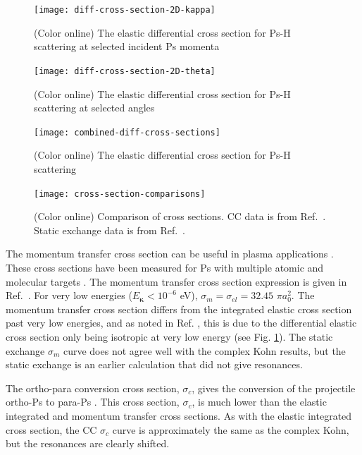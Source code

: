 \documentclass[preprint,showpacs,showkeys,preprintnumbers,amsmath,amssymb,longbibliography,pra,aps]{revtex4-1}
\begin{document}
\begin{figure}[H]
	\centering
	\texttt{[image: diff-cross-section-2D-kappa]}
	\caption{(Color online) The elastic differential cross section for Ps-H
scattering at selected incident Ps momenta}
	\label{fig:diff-cross-section-2D-kappa}
\end{figure}

\begin{figure}[H]
	\centering
	\texttt{[image: diff-cross-section-2D-theta]}
	\caption{(Color online) The elastic differential cross section for Ps-H
scattering at selected angles}
	\label{fig:diff-cross-section-2D-theta}
\end{figure}

\begin{figure}[H]
	\centering
	\texttt{[image: combined-diff-cross-sections]}
	\caption{(Color online) The elastic differential cross section for Ps-H
scattering}
	\label{fig:combined-diff-cross-sections}
\end{figure}

\begin{figure}[H]
	\centering
	\texttt{[image: cross-section-comparisons]}
	\caption{(Color online) Comparison of cross sections. CC data is from
Ref.~\cite{Blackwood2002}. Static exchange data is from Ref.~\cite{Hara1975}.}
	\label{fig:cross-section-comparisons}
\end{figure}

The momentum transfer cross section can be useful in plasma applications
\cite{Wang2014, McEachran2014}. These cross sections have been measured for Ps
with multiple atomic and molecular targets \cite{Nagashima1998,Saito2003}. The
momentum transfer cross section expression is given in Ref.~\cite{Bransden2003}.
For very low 
energies ($E_{\bm \kappa} < 10^{-6}$ eV),
$\sigma_m = \sigma_{el} = 32.45$ $\pi a_0^2$.
The momentum transfer cross section differs from the integrated elastic cross
section past very low energies, and as 
noted in Ref. \cite{Blackwood2002c}, this is due to the differential elastic 
cross section only being isotropic at very low energy
(see Fig. \ref{fig:diff-cross-section-2D-kappa}). The static
exchange $\sigma_m$ curve \cite{Hara1975} does not agree well with the
complex Kohn results, but the static exchange is an earlier calculation 
that did not give resonances.

The ortho-para conversion cross section, $\sigma_c$, gives the conversion
of the projectile ortho-Ps to para-Ps \cite{Hara1975}.
This cross section, $\sigma_c$, is much lower than the elastic integrated and
momentum transfer cross sections. As with the elastic integrated cross
section, the CC $\sigma_c$ curve \cite{Blackwood2002} is approximately the
same as the complex Kohn, but the resonances are clearly shifted.
\end{document}
